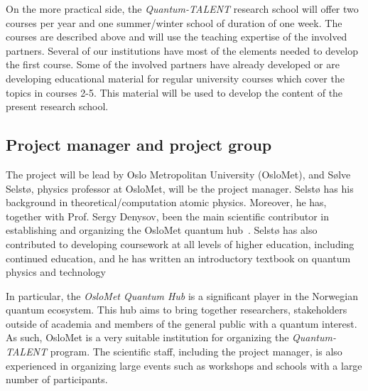 \documentclass{scrreprt}
\begin{document}
On the more practical side, the \textit{Quantum-TALENT} research school will offer two courses per year and one summer/winter school of duration of one week. The courses are described above and will use the teaching expertise of the involved partners. Several of our institutions have most of the elements needed to develop the first course. Some of the involved partners have already developed or are developing educational material for regular university courses which cover the topics in courses 2-5. 
This material will be used to develop the content of the present research school. 

\begin{comment}
\textit{The researcher school must be realistic and feasible, scientifically, organisationally, and in relation to planned use of resources. Please provide supplementary information that substantiates implementation capacity. Please describe
-	the planned organisation and implementation of the researcher school, including the planning of the individual components as well as the anticipated interaction between them;  
-	the management and organisation of the researcher school, including coordination, scientific management functions, relationship between the parties in the network and between the network, and the institutions’ doctoral degree programmes;  
-	the expertise and resources that will be available to the researcher school, including positions related the school (head coordinator etc.) and other types of contributions from the participating institutions (infrastructure etc.);
-	measures to improve gender balance and diversity, where relevant.}
\end{comment}

\subsection{Project manager and project group}
The project will be lead by Oslo Metropolitan University (OsloMet), and Sølve Selstø, physics professor at OsloMet, will be the project manager. Selstø has his background in theoretical/computation atomic physics. Moreover, he has, together with Prof. Sergy Denysov, been the main scientific contributor in establishing and organizing the OsloMet quantum hub~\cite{QHub}. Selstø has also contributed to developing coursework at all levels of higher education, including continued education, and he has written an introductory textbook on quantum physics and technology~\cite{Selsto2024}

In particular, the \textit{OsloMet Quantum Hub} is a significant player in the Norwegian quantum ecosystem. This hub aims to bring together researchers, stakeholders outside of academia and members of the general public with a quantum interest. As such, OsloMet is a very suitable institution for organizing the \textit{Quantum-TALENT} program. The scientific staff, including the project manager, is also experienced in organizing large events such as workshops and schools with a large number of participants.
\end{document}
